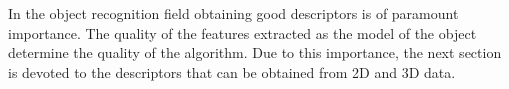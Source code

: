 

In the object recognition field obtaining good descriptors is of paramount importance. 
The quality of the features extracted as the model of the object determine the quality of the algorithm. 
Due to this importance, the next section is devoted to the descriptors that can be obtained from 2D and 3D data.

